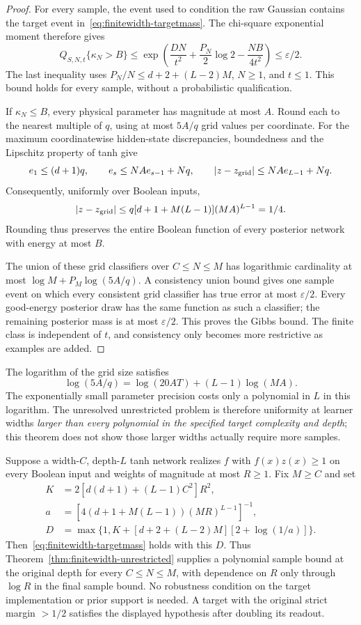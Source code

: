 \begin{proof}
For every sample, the event used to condition the raw Gaussian contains the
target event in~\eqref{eq:finitewidth-targetmass}. The chi-square exponential
moment therefore gives
\[
 Q_{S,N,t}\{\kappa_N>B\}
 \le\exp\left(\frac{DN}{t^2}+\frac{P_N}2\log2-
                       \frac{NB}{4t^2}\right)
 \le\varepsilon/2.
\]
The last inequality uses $P_N/N\le d+2+(L-2)M$, $N\ge1$, and $t\le1$.
This bound holds for every sample, without a probabilistic qualification.

If $\kappa_N\le B$, every physical parameter has magnitude at most $A$.
Round each to the nearest multiple of $q$, using at most $5A/q$ grid values
per coordinate. For the maximum coordinatewise hidden-state discrepancies,
boundedness and the Lipschitz property of tanh give
\[
 e_1\le(d+1)q,\qquad e_s\le NAe_{s-1}+Nq,\qquad
 |z-z_{\rm grid}|\le NAe_{L-1}+Nq.
\]
Consequently, uniformly over Boolean inputs,
\[
 |z-z_{\rm grid}|\le q[d+1+M(L-1)](MA)^{L-1}=1/4.
\]
Rounding thus preserves the entire Boolean function of every posterior
network with energy at most $B$.

The union of these grid classifiers over $C\le N\le M$ has logarithmic
cardinality at most $\log M+P_M\log(5A/q)$. A consistency union bound gives
one sample event on which every consistent grid classifier has true error
at most $\varepsilon/2$. Every good-energy posterior draw has the same
function as such a classifier; the remaining posterior mass is at most
$\varepsilon/2$. This proves the Gibbs bound. The finite class is independent
of $t$, and consistency only becomes more restrictive as examples are added.
\end{proof}

The logarithm of the grid size satisfies
\[
 \log(5A/q)=\log(20AT)+(L-1)\log(MA).
\]
The exponentially small parameter precision costs only a polynomial in
$L$ in this logarithm. The unresolved unrestricted problem is therefore
uniformity at learner widths \emph{larger than every polynomial in the
specified target complexity and depth}; this theorem does not show those
larger widths actually require more samples.

\begin{corollary}
Suppose a width-$C$, depth-$L$ tanh network realizes $f$ with
$f(x)z(x)\ge1$ on every Boolean input and weights of magnitude at most
$R\ge1$. Fix $M\ge C$ and set
\begin{align*}
 K&=2[d(d+1)+(L-1)C^2]R^2,\\
 a&=[4(d+1+M(L-1))(MR)^{L-1}]^{-1},\\
 D&=\max\{1,K+[d+2+(L-2)M][2+\log(1/a)]\}.
\end{align*}
Then~\eqref{eq:finitewidth-targetmass} holds with this $D$.
Thus Theorem~\ref{thm:finitewidth-unrestricted} supplies a polynomial sample
bound at the original depth for every $C\le N\le M$, with dependence on
$R$ only through $\log R$ in the final sample bound. No robustness condition
on the target implementation or prior support is needed. A target with the
original strict margin $>1/2$ satisfies the displayed hypothesis after
doubling its readout.
\end{corollary}

